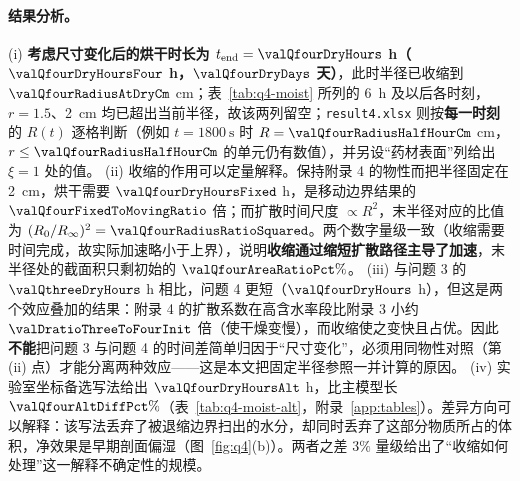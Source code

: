 
\paragraph{结果分析。} (i) \textbf{考虑尺寸变化后的烘干时长为 $t_{\mathrm{end}}=\valQfourDryHours$ h（$\valQfourDryHoursFour$ h，$\valQfourDryDays$ 天）}，此时半径已收缩到 $\valQfourRadiusAtDryCm$ \si{\centi\meter}；表~\ref{tab:q4-moist} 所列的 \SI{6}{\hour} 及以后各时刻，$r=1.5$、\SI{2}{\centi\meter} 均已超出当前半径，故该两列留空；\nolinkurl{result4.xlsx} 则按\textbf{每一时刻}的 $R(t)$ 逐格判断（例如 $t=\SI{1800}{\second}$ 时 $R=\valQfourRadiusHalfHourCm$ \si{\centi\meter}，$r\le\valQfourRadiusHalfHourCm$ 的单元仍有数值），并另设“药材表面”列给出 $\xi=1$ 处的值。
(ii) 收缩的作用可以定量解释。保持附录 4 的物性而把半径固定在 \SI{2}{\centi\meter}，烘干需要 $\valQfourDryHoursFixed$ h，是移动边界结果的 $\valQfourFixedToMovingRatio$ 倍；而扩散时间尺度 $\propto R^2$，末半径对应的比值为 $(R_0/R_\infty)^2=\valQfourRadiusRatioSquared$。两个数字量级一致（收缩需要时间完成，故实际加速略小于上界），说明\textbf{收缩通过缩短扩散路径主导了加速}，末半径处的截面积只剩初始的 $\valQfourAreaRatioPct\%$。
(iii) 与问题 3 的 $\valQthreeDryHours$ h 相比，问题 4 更短（$\valQfourDryHours$ h），但这是两个效应叠加的结果：附录 4 的扩散系数在高含水率段比附录 3 小约 $\valDratioThreeToFourInit$ 倍（使干燥变慢），而收缩使之变快且占优。因此\textbf{不能}把问题 3 与问题 4 的时间差简单归因于“尺寸变化”，必须用同物性对照（第 (ii) 点）才能分离两种效应——这是本文把固定半径参照一并计算的原因。
(iv) 实验室坐标备选写法给出 $\valQfourDryHoursAlt$ h，比主模型长 $\valQfourAltDiffPct\%$（表~\ref{tab:q4-moist-alt}，附录~\ref{app:tables}）。差异方向可以解释：该写法丢弃了被退缩边界扫出的水分，却同时丢弃了这部分物质所占的体积，净效果是早期剖面偏湿（图~\ref{fig:q4}(b)）。两者之差 $3\%$ 量级给出了“收缩如何处理”这一解释不确定性的规模。
